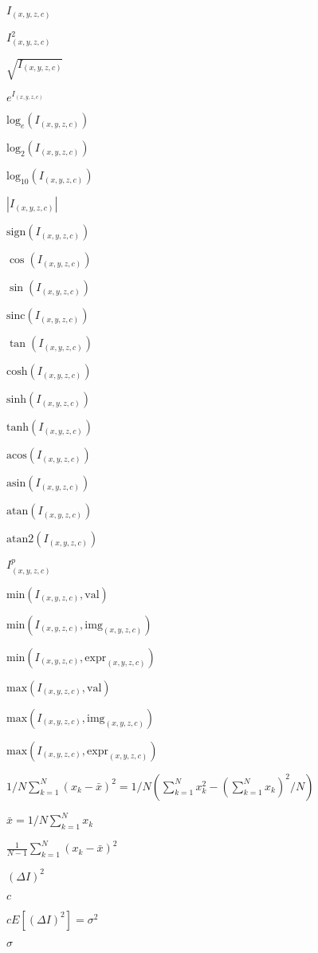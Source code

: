 \documentclass{article}
\begin{document}
$I_{(x,y,z,c)}$
\pagebreak

$I_{(x,y,z,c)}^2$
\pagebreak

$\sqrt{I_{(x,y,z,c)}}$
\pagebreak

$e^{I_{(x,y,z,c)}}$
\pagebreak

$\mathrm{log}_{e}(I_{(x,y,z,c)})$
\pagebreak

$\mathrm{log}_{2}(I_{(x,y,z,c)})$
\pagebreak

$\mathrm{log}_{10}(I_{(x,y,z,c)})$
\pagebreak

$|I_{(x,y,z,c)}|$
\pagebreak

$\mathrm{sign}(I_{(x,y,z,c)})$
\pagebreak

$\cos(I_{(x,y,z,c)})$
\pagebreak

$\sin(I_{(x,y,z,c)})$
\pagebreak

$\mathrm{sinc}(I_{(x,y,z,c)})$
\pagebreak

$\tan(I_{(x,y,z,c)})$
\pagebreak

$\mathrm{cosh}(I_{(x,y,z,c)})$
\pagebreak

$\mathrm{sinh}(I_{(x,y,z,c)})$
\pagebreak

$\mathrm{tanh}(I_{(x,y,z,c)})$
\pagebreak

$\mathrm{acos}(I_{(x,y,z,c)})$
\pagebreak

$\mathrm{asin}(I_{(x,y,z,c)})$
\pagebreak

$\mathrm{atan}(I_{(x,y,z,c)})$
\pagebreak

$\mathrm{atan2}(I_{(x,y,z,c)})$
\pagebreak

$I_{(x,y,z,c)}^p$
\pagebreak

$\mathrm{min}(I_{(x,y,z,c)},\mathrm{val})$
\pagebreak

$\mathrm{min}(I_{(x,y,z,c)},\mathrm{img}_{(x,y,z,c)})$
\pagebreak

$\mathrm{min}(I_{(x,y,z,c)},\mathrm{expr}_{(x,y,z,c)})$
\pagebreak

$\mathrm{max}(I_{(x,y,z,c)},\mathrm{val})$
\pagebreak

$\mathrm{max}(I_{(x,y,z,c)},\mathrm{img}_{(x,y,z,c)})$
\pagebreak

$\mathrm{max}(I_{(x,y,z,c)},\mathrm{expr}_{(x,y,z,c)})$
\pagebreak

$1/N \sum\limits_{k=1}^{N} (x_k - \bar x)^2 = 1/N \left( \sum\limits_{k=1}^N x_k^2 - \left( \sum\limits_{k=1}^N x_k \right)^2 / N \right)$
\pagebreak

$ \bar x = 1/N \sum\limits_{k=1}^N x_k $
\pagebreak

$\frac{1}{N - 1} \sum\limits_{k=1}^{N} (x_k - \bar x)^2 $
\pagebreak

$(\Delta I)^2 $
\pagebreak

$c$
\pagebreak

$ c E[(\Delta I)^2]= \sigma^2$
\pagebreak

$\sigma$
\pagebreak
\end{document}
